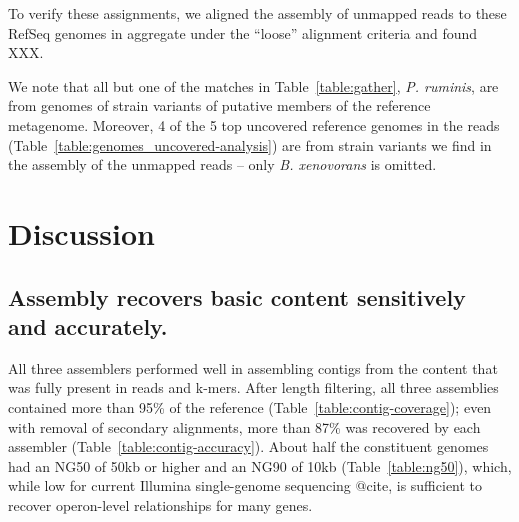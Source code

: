 \documentclass[10pt,a4paper,twocolumn]{article}
\begin{document}

To verify these assignments, we aligned the assembly of unmapped reads
to these RefSeq genomes in aggregate under the ``loose'' alignment
criteria and found XXX.

We note that all but one of the matches in Table~\ref{table:gather},
{\em P. ruminis}, are from genomes of strain variants of putative
members of the reference metagenome.  Moreover, 4 of the 5 top
uncovered reference genomes in the reads
(Table~\ref{table:genomes_uncovered-analysis}) are from strain
variants we find in the assembly of the unmapped reads -- only {\em
  B. xenovorans} is omitted.


\section*{Discussion}

\subsection*{Assembly recovers basic content sensitively and accurately.}

All three assemblers performed well in assembling contigs from the
content that was fully present in reads and k-mers.  After length filtering,
all three assemblies contained more than 95\% of the reference
(Table~\ref{table:contig-coverage}); even with removal of secondary
alignments, more than 87\% was recovered by each assembler
(Table~\ref{table:contig-accuracy}). About half the constituent genomes had
an NG50 of 50kb or higher and an NG90 of 10kb (Table~\ref{table:ng50}),
which, while low for current Illumina single-genome sequencing @cite,
is sufficient to recover operon-level relationships for many genes.
\end{document}
